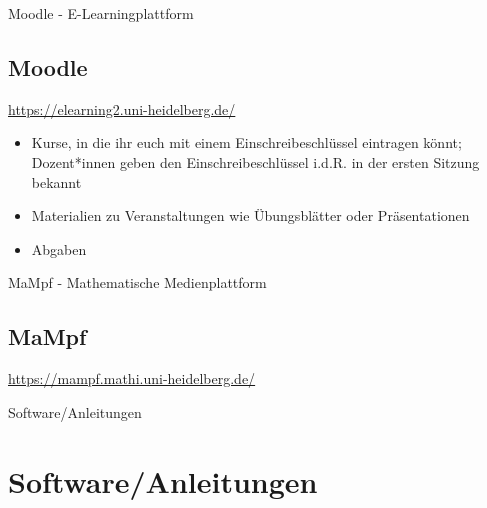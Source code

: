 \begin{frame}{Moodle - E-Learningplattform}
  \subsection{Moodle}

  \url{https://elearning2.uni-heidelberg.de/}

  \begin{center}
  \end{center}

  \begin{itemize}
    \item{Kurse, in die ihr euch mit einem Einschreibeschlüssel eintragen könnt; Dozent*innen geben den Einschreibeschlüssel i.d.R. in der ersten Sitzung bekannt}
    \item{Materialien zu Veranstaltungen wie Übungsblätter oder Präsentationen}
    \item{Abgaben}
  \end{itemize}

\end{frame}


\begin{frame}{MaMpf - Mathematische Medienplattform}
  \subsection{MaMpf}

  \url{https://mampf.mathi.uni-heidelberg.de/}

  \begin{center}
  \end{center}

\end{frame}


\begin{frame}{Software/Anleitungen}
  \section{Software/Anleitungen}
\end{frame}

